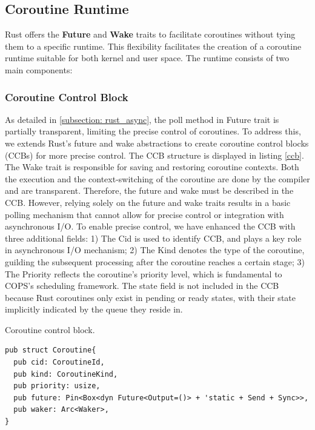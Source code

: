 \documentclass[conference]{IEEEtran}
\begin{document}
\subsection{Coroutine Runtime}
\label{section: Coroutine Runtime}

Rust offers the \textbf{Future} and \textbf{Wake} traits to facilitate coroutines without tying them to a specific runtime. This flexibility facilitates the creation of a coroutine runtime suitable for both kernel and user space. The runtime consists of two main components: 

\subsubsection{Coroutine Control Block}

As detailed in \ref{subsection: rust_async}, the poll method in Future trait is partially transparent, limiting the precise control of coroutines. To address this, we extends Rust's future and wake abstractions to create coroutine control blocks (CCBs) for more precise control. The CCB structure is displayed in listing \ref{ccb}. The Wake trait is responsible for saving and restoring coroutine contexts. Both the execution and the context-switching of the coroutine are done by the compiler and are transparent. Therefore, the future and wake must be described in the CCB. However, relying solely on the future and wake traits results in a basic polling mechanism that cannot allow for precise control or integration with asynchronous I/O. To enable precise control, we have enhanced the CCB with three additional fields: 1) The Cid is used to identify CCB, and plays a key role in asynchronous I/O mechanism; 2) The Kind denotes the type of the coroutine, guilding the subsequent processing after the coroutine reaches a certain stage; 3) The Priority reflects the coroutine's priority level, which is fundamental to COPS's scheduling framework. The state field is not included in the CCB because Rust coroutines only exist in pending or ready states, with their state implicitly indicated by the queue they reside in.


\begin{listing}
\caption{Coroutine control block.}
\label{ccb}
\begin{mdframed}
\begin{verbatim}
pub struct Coroutine{
  pub cid: CoroutineId,
  pub kind: CoroutineKind,
  pub priority: usize,
  pub future: Pin<Box<dyn Future<Output=()> + 'static + Send + Sync>>, 
  pub waker: Arc<Waker>,
}
\end{verbatim}
\end{mdframed}
\end{listing}
\end{document}
